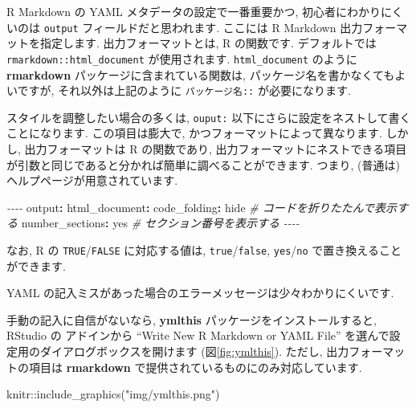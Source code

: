 \documentclass[
]{bxjsarticle}
\newenvironment{Shaded}{\begin{snugshade}}{\end{snugshade}}
\newcommand{\AttributeTok}[1]{\textcolor[rgb]{0.77,0.63,0.00}{#1}}
\newcommand{\CharTok}[1]{\textcolor[rgb]{0.31,0.60,0.02}{#1}}
\newcommand{\CommentTok}[1]{\textcolor[rgb]{0.56,0.35,0.01}{\textit{#1}}}
\newcommand{\FunctionTok}[1]{\textcolor[rgb]{0.00,0.00,0.00}{#1}}
\newcommand{\KeywordTok}[1]{\textcolor[rgb]{0.13,0.29,0.53}{\textbf{#1}}}
\newcommand{\NormalTok}[1]{#1}
\newcommand{\PreprocessorTok}[1]{\textcolor[rgb]{0.56,0.35,0.01}{\textit{#1}}}
\newcommand{\SpecialCharTok}[1]{\textcolor[rgb]{0.00,0.00,0.00}{#1}}
\newcommand{\StringTok}[1]{\textcolor[rgb]{0.31,0.60,0.02}{#1}}
\begin{document}
R Markdown の YAML メタデータの設定で一番重要かつ, 初心者にわかりにくいのは \texttt{output} フィールドだと思われます. ここには R Markdown 出力フォーマットを指定します. 出力フォーマットとは, R の関数です. デフォルトでは \texttt{rmarkdown::html\_document} が使用されます. \texttt{html\_document} のように \textbf{rmarkdown} パッケージに含まれている関数は, パッケージ名を書かなくてもよいですが, それ以外は上記のように \texttt{パッケージ名::} が必要になります.

スタイルを調整したい場合の多くは, \texttt{ouput:} 以下にさらに設定をネストして書くことになります. この項目は膨大で, かつフォーマットによって異なります. しかし, 出力フォーマットは R の関数であり, 出力フォーマットにネストできる項目が引数と同じであると分かれば簡単に調べることができます. つまり, (普通は) ヘルプページが用意されています.

\begin{Shaded}
\begin{Highlighting}[]
\PreprocessorTok{{-}{-}{-}{-}}
\FunctionTok{output}\KeywordTok{:}
\AttributeTok{  }\FunctionTok{html\_document}\KeywordTok{:}
\AttributeTok{    }\FunctionTok{code\_folding}\KeywordTok{:}\AttributeTok{ hide}\CommentTok{  \# コードを折りたたんで表示する}
\AttributeTok{    }\FunctionTok{number\_sections}\KeywordTok{:}\AttributeTok{ }\CharTok{yes}\CommentTok{  \# セクション番号を表示する}
\PreprocessorTok{{-}{-}{-}{-}}
\end{Highlighting}
\end{Shaded}

なお, R の \texttt{TRUE}/\texttt{FALSE} に対応する値は, \texttt{true}/\texttt{false}, \texttt{yes}/\texttt{no} で置き換えることができます.

YAML の記入ミスがあった場合のエラーメッセージは少々わかりにくいです.

手動の記入に自信がないなら, \textbf{ymlthis} パッケージをインストールすると, RStudio の アドインから ``Write New R Markdown or YAML File'' を選んで設定用のダイアログボックスを開けます (図\ref{fig:ymlthis}). ただし, 出力フォーマットの項目は \textbf{rmarkdown} で提供されているものにのみ対応しています.



\begin{Shaded}
\begin{Highlighting}[numbers=left,,]
\NormalTok{knitr}\SpecialCharTok{::}\FunctionTok{include\_graphics}\NormalTok{(}\StringTok{"img/ymlthis.png"}\NormalTok{)}
\end{Highlighting}
\end{Shaded}
\end{document}
